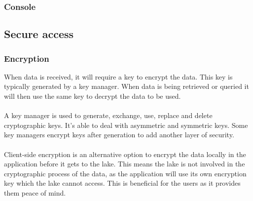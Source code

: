 \documentclass[10pt]{article}
\begin{document}
\subsubsection{Console}

\subsection{Secure access}
\subsubsection{Encryption}

When data is received, it will require a key to encrypt the data. This key is typically generated by a key manager. When data is being retrieved or queried it will then use the same key to decrypt the data to be used.
\\ \\
A key manager is used to generate, exchange, use, replace and delete cryptographic keys. It's able to deal with asymmetric and symmetric keys. Some key managers encrypt keys after generation to add another layer of security.
\\ \\
Client-side encryption is an alternative option to encrypt the data locally in the application before it gets to the lake. This means the lake is not involved in the cryptographic process of the data, as the application will use its own encryption key which the lake cannot access. This is beneficial for the users as it provides them peace of mind.
\newpage
\end{document}
